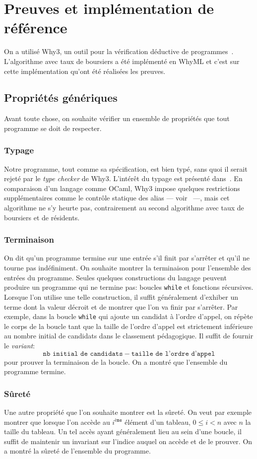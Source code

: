 \section{Preuves et implémentation de référence}
  On a utilisé Why3, un outil pour la vérification déductive de programmes~\cite{Filliatre13}. L'algorithme avec taux de boursiers a été implémenté en WhyML et c'est sur cette implémentation qu'ont été réalisées les preuves.
  \subsection{Propriétés génériques}
    Avant toute chose, on souhaite vérifier un ensemble de propriétés que tout programme se doit de respecter.
  \subsubsection{Typage}
    Notre programme, tout comme sa spécification, est bien typé, sans quoi il serait rejeté par le \emph{type checker} de Why3. L'intérêt du typage est présenté dans~\cite{Milner78}. En comparaison d'un langage comme OCaml, Why3 impose quelques restrictions supplémentaires comme le contrôle statique des alias --- voir~\cite{Gondelman16} ---, mais cet algorithme ne s'y heurte pas, contrairement au second algorithme avec taux de boursiers et de résidents.
    \subsubsection{Terminaison}
      On dit qu'un programme termine sur une entrée s'il finit par s'arrêter et qu'il ne tourne pas indéfiniment. On souhaite montrer la terminaison pour l'ensemble des entrées du programme. Seules quelques constructions du langage peuvent produire un programme qui ne termine pas: boucles \texttt{while} et fonctions récursives. Lorsque l'on utilise une telle construction, il suffit généralement d'exhiber un terme dont la valeur décroit et de montrer que l'on va finir par s'arrêter. Par exemple, dans la boucle \texttt{while} qui ajoute un candidat à l'ordre d'appel, on répète le corps de la boucle tant que la taille de l'ordre d'appel est strictement inférieure au nombre initial de candidats dans le classement pédagogique. Il suffit de fournir le \emph{variant}:
      \[\texttt{nb initial de candidats}~-~\texttt{taille de l'ordre d'appel}\]
pour prouver la terminaison de la boucle.
      On a montré que l'ensemble du programme termine.
    \subsubsection{Sûreté}
      Une autre propriété que l'on souhaite montrer est la sûreté. On veut par exemple montrer que lorsque l'on accède au $i^\texttt{ème}$ élément d'un tableau, $0 \leq i < n$ avec $n$ la taille du tableau. Un tel accès ayant généralement lieu au sein d'une boucle, il suffit de maintenir un invariant sur l'indice auquel on accède et de le prouver.
      On a montré la sûreté de l'ensemble du programme.
